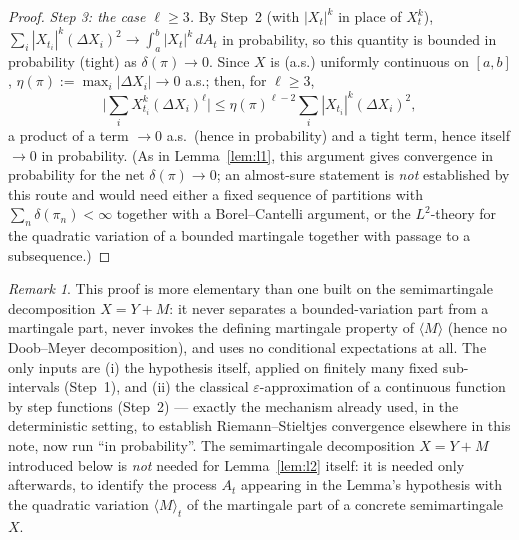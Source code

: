 \documentclass[11pt,fleqn]{article}
\newcommand{\eps}{\varepsilon}
\theoremstyle{plain}
\theoremstyle{remark}
\newtheorem{remark}[thm]{Remark}
\begin{document}
\begin{proof}
\medskip\noindent\textit{Step 3: the case $\ell\ge3$.} By Step~2 (with
$|X_t|^k$ in place of $X_t^k$), $\sum_i|X_{t_i}|^k(\Delta X_i)^2\to
\int_a^b|X_t|^k\,dA_t$ in probability, so this quantity is bounded in
probability (tight) as $\delta(\pi)\to0$. Since $X$ is (a.s.) uniformly
continuous on $[a,b]$, $\eta(\pi):=\max_i|\Delta X_i|\to0$ a.s.; then, for
$\ell\ge3$,
\[
\Big|\sum_iX_{t_i}^k(\Delta X_i)^\ell\Big|
\le\eta(\pi)^{\ell-2}\sum_i|X_{t_i}|^k(\Delta X_i)^2,
\]
a product of a term $\to0$ a.s.\ (hence in probability) and a tight term,
hence itself $\to0$ in probability. (As in Lemma~\ref{lem:l1}, this
argument gives convergence in probability for the net $\delta(\pi)\to0$;
an almost-sure statement is \emph{not} established by this route and
would need either a fixed sequence of partitions with
$\sum_n\delta(\pi_n)<\infty$ together with a Borel--Cantelli argument, or
the $L^2$-theory for the quadratic variation of a bounded martingale
together with passage to a subsequence.)
\end{proof}

\begin{remark}
This proof is more elementary than one built on the semimartingale
decomposition $X=Y+M$: it never separates a bounded-variation part from a
martingale part, never invokes the defining martingale property of
$\langle M\rangle$ (hence no Doob--Meyer decomposition), and uses no
conditional expectations at all. The only inputs are (i) the hypothesis
itself, applied on finitely many fixed sub-intervals (Step~1), and (ii)
the classical $\eps$-approximation of a continuous function by step
functions (Step~2) — exactly the mechanism already used, in the
deterministic setting, to establish Riemann--Stieltjes convergence
elsewhere in this note, now run ``in probability''. The semimartingale
decomposition $X=Y+M$ introduced below is \emph{not} needed for
Lemma~\ref{lem:l2} itself: it is needed only afterwards, to identify the
process $A_t$ appearing in the Lemma's hypothesis with the quadratic
variation $\langle M\rangle_t$ of the martingale part of a concrete
semimartingale $X$.
\end{remark}
\end{document}
